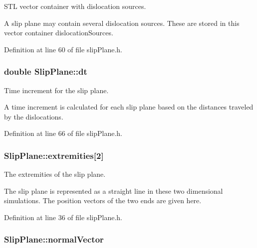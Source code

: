 \-S\-T\-L vector container with dislocation sources. 

\-A slip plane may contain several dislocation sources. \-These are stored in this vector container dislocation\-Sources. 

\-Definition at line 60 of file slip\-Plane.\-h.

\hypertarget{classSlipPlane_ad786135547799363ad2931e43522c2be}{
\subsubsection[{dt}]{\setlength{\rightskip}{0pt plus 5cm}double {\bf \-Slip\-Plane\-::dt}}}\label{db/d25/classSlipPlane_ad786135547799363ad2931e43522c2be}


\-Time increment for the slip plane. 

\-A time increment is calculated for each slip plane based on the distances traveled by the dislocations. 

\-Definition at line 66 of file slip\-Plane.\-h.

\hypertarget{classSlipPlane_abbdbe6ed805faf3777b54ff55a9c089c}{
\subsubsection[{extremities}]{ {\bf \-Slip\-Plane\-::extremities}\mbox{[}2\mbox{]}}}\label{db/d25/classSlipPlane_abbdbe6ed805faf3777b54ff55a9c089c}


\-The extremities of the slip plane. 

\-The slip plane is represented as a straight line in these two dimensional simulations. \-The position vectors of the two ends are given here. 

\-Definition at line 36 of file slip\-Plane.\-h.

\hypertarget{classSlipPlane_aad33ce7b595e5fc55aefe51c7b0957f2}{
\subsubsection[{normal\-Vector}]{ {\bf \-Slip\-Plane\-::normal\-Vector}}}\label{db/d25/classSlipPlane_aad33ce7b595e5fc55aefe51c7b0957f2}


